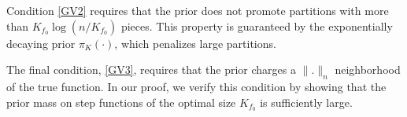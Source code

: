 \documentclass{article}
\newcommand{\1}{\mathbb{I}}
\theoremstyle{assumption}
\begin{document}
Condition \ref{GV2} requires that the prior does not promote partitions with  more than $K_{f_0}\log{(n/K_{f_0})}$ pieces. This property is guaranteed by the exponentially decaying
 prior $\pi_K(\cdot)$, which  penalizes large partitions. 



The final condition, \ref{GV3}, requires that the prior charges a $\|.\|_n$ neighborhood of the true function. In our proof, we verify this condition by showing that the prior mass on step functions of the optimal size {$K_{f_0}$} is sufficiently large.
\end{document}
